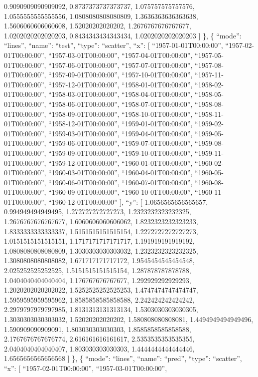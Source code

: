 \documentclass[
]{article}
\begin{document}
0.9090909090909092, 0.8737373737373737, 1.075757575757576,
1.0555555555555556, 1.0808080808080809, 1.3636363636363638,
1.5606060606060608, 1.52020202020202, 1.2676767676767677,
1.0202020202020203, 0.8434343434343434, 1.0202020202020203 {]} \}, \{
``mode'': ``lines'', ``name'': ``test'', ``type'': ``scatter'', ``x'':
{[} ``1957-01-01T00:00:00'', ``1957-02-01T00:00:00'',
``1957-03-01T00:00:00'', ``1957-04-01T00:00:00'',
``1957-05-01T00:00:00'', ``1957-06-01T00:00:00'',
``1957-07-01T00:00:00'', ``1957-08-01T00:00:00'',
``1957-09-01T00:00:00'', ``1957-10-01T00:00:00'',
``1957-11-01T00:00:00'', ``1957-12-01T00:00:00'',
``1958-01-01T00:00:00'', ``1958-02-01T00:00:00'',
``1958-03-01T00:00:00'', ``1958-04-01T00:00:00'',
``1958-05-01T00:00:00'', ``1958-06-01T00:00:00'',
``1958-07-01T00:00:00'', ``1958-08-01T00:00:00'',
``1958-09-01T00:00:00'', ``1958-10-01T00:00:00'',
``1958-11-01T00:00:00'', ``1958-12-01T00:00:00'',
``1959-01-01T00:00:00'', ``1959-02-01T00:00:00'',
``1959-03-01T00:00:00'', ``1959-04-01T00:00:00'',
``1959-05-01T00:00:00'', ``1959-06-01T00:00:00'',
``1959-07-01T00:00:00'', ``1959-08-01T00:00:00'',
``1959-09-01T00:00:00'', ``1959-10-01T00:00:00'',
``1959-11-01T00:00:00'', ``1959-12-01T00:00:00'',
``1960-01-01T00:00:00'', ``1960-02-01T00:00:00'',
``1960-03-01T00:00:00'', ``1960-04-01T00:00:00'',
``1960-05-01T00:00:00'', ``1960-06-01T00:00:00'',
``1960-07-01T00:00:00'', ``1960-08-01T00:00:00'',
``1960-09-01T00:00:00'', ``1960-10-01T00:00:00'',
``1960-11-01T00:00:00'', ``1960-12-01T00:00:00'' {]}, ``y'': {[}
1.0656565656565657, 0.994949494949495, 1.272727272727273,
1.2323232323232325, 1.2676767676767677, 1.6060606060606062,
1.8232323232323233, 1.8333333333333337, 1.5151515151515154,
1.2272727272727273, 1.0151515151515151, 1.1717171717171717,
1.191919191919192, 1.0808080808080809, 1.3030303030303032,
1.2323232323232325, 1.3080808080808082, 1.671717171717172,
1.9545454545454548, 2.025252525252525, 1.5151515151515154,
1.287878787878788, 1.0404040404040404, 1.176767676767677,
1.292929292929293, 1.2020202020202022, 1.5252525252525253,
1.4747474747474747, 1.5959595959595962, 1.8585858585858588,
2.242424242424242, 2.2979797979797985, 1.8131313131313134,
1.5303030303030305, 1.3030303030303032, 1.52020202020202,
1.580808080808081, 1.4494949494949496, 1.590909090909091,
1.803030303030303, 1.8585858585858588, 2.1767676767676774,
2.616161616161617, 2.5353535353535355, 2.0404040404040407,
1.803030303030303, 1.4444444444444446, 1.6565656565656568 {]} \}, \{
``mode'': ``lines'', ``name'': ``pred'', ``type'': ``scatter'', ``x'':
{[} ``1957-02-01T00:00:00'', ``1957-03-01T00:00:00'',
\end{document}
